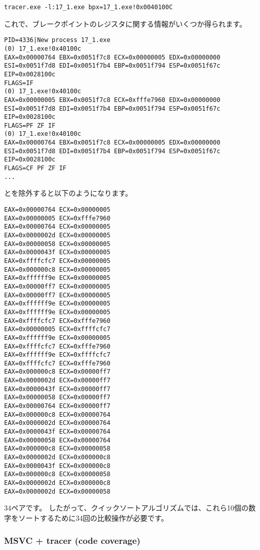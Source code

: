 \begin{lstlisting}
tracer.exe -l:17_1.exe bpx=17_1.exe!0x0040100C
\end{lstlisting}

これで、ブレークポイントのレジスタに関する情報がいくつか得られます。

\begin{lstlisting}
PID=4336|New process 17_1.exe
(0) 17_1.exe!0x40100c
EAX=0x00000764 EBX=0x0051f7c8 ECX=0x00000005 EDX=0x00000000
ESI=0x0051f7d8 EDI=0x0051f7b4 EBP=0x0051f794 ESP=0x0051f67c
EIP=0x0028100c
FLAGS=IF
(0) 17_1.exe!0x40100c
EAX=0x00000005 EBX=0x0051f7c8 ECX=0xfffe7960 EDX=0x00000000
ESI=0x0051f7d8 EDI=0x0051f7b4 EBP=0x0051f794 ESP=0x0051f67c
EIP=0x0028100c
FLAGS=PF ZF IF
(0) 17_1.exe!0x40100c
EAX=0x00000764 EBX=0x0051f7c8 ECX=0x00000005 EDX=0x00000000
ESI=0x0051f7d8 EDI=0x0051f7b4 EBP=0x0051f794 ESP=0x0051f67c
EIP=0x0028100c
FLAGS=CF PF ZF IF
...
\end{lstlisting}

とを除外すると以下のようになります。

\begin{lstlisting}
EAX=0x00000764 ECX=0x00000005
EAX=0x00000005 ECX=0xfffe7960
EAX=0x00000764 ECX=0x00000005
EAX=0x0000002d ECX=0x00000005
EAX=0x00000058 ECX=0x00000005
EAX=0x0000043f ECX=0x00000005
EAX=0xffffcfc7 ECX=0x00000005
EAX=0x000000c8 ECX=0x00000005
EAX=0xffffff9e ECX=0x00000005
EAX=0x00000ff7 ECX=0x00000005
EAX=0x00000ff7 ECX=0x00000005
EAX=0xffffff9e ECX=0x00000005
EAX=0xffffff9e ECX=0x00000005
EAX=0xffffcfc7 ECX=0xfffe7960
EAX=0x00000005 ECX=0xffffcfc7
EAX=0xffffff9e ECX=0x00000005
EAX=0xffffcfc7 ECX=0xfffe7960
EAX=0xffffff9e ECX=0xffffcfc7
EAX=0xffffcfc7 ECX=0xfffe7960
EAX=0x000000c8 ECX=0x00000ff7
EAX=0x0000002d ECX=0x00000ff7
EAX=0x0000043f ECX=0x00000ff7
EAX=0x00000058 ECX=0x00000ff7
EAX=0x00000764 ECX=0x00000ff7
EAX=0x000000c8 ECX=0x00000764
EAX=0x0000002d ECX=0x00000764
EAX=0x0000043f ECX=0x00000764
EAX=0x00000058 ECX=0x00000764
EAX=0x000000c8 ECX=0x00000058
EAX=0x0000002d ECX=0x000000c8
EAX=0x0000043f ECX=0x000000c8
EAX=0x000000c8 ECX=0x00000058
EAX=0x0000002d ECX=0x000000c8
EAX=0x0000002d ECX=0x00000058
\end{lstlisting}

34ペアです。
したがって、クイックソートアルゴリズムでは、これら10個の数字をソートするために34回の比較操作が必要です。

\clearpage
\subsubsection{MSVC + tracer (code coverage)}

